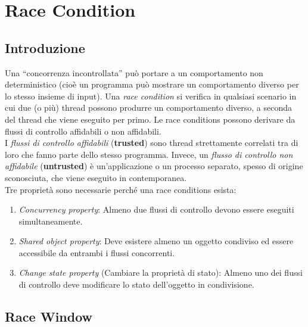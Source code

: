 \chapter{Race Condition}

\section{Introduzione}

Una “concorrenza incontrollata” può portare a un comportamento non deterministico
(cioè un programma può mostrare un comportamento diverso per lo stesso insieme
di input).
Una \textit{race condition} si verifica in qualsiasi scenario in cui due (o più)
thread possono
produrre un comportamento diverso, a seconda del thread che viene eseguito per primo.
Le race conditions possono derivare da flussi di controllo affidabili o non
affidabili.\\
I \textit{flussi di controllo affidabili} (\textbf{trusted}) sono thread
strettamente correlati tra di loro che fanno parte dello stesso programma.
Invece, un \textit{flusso di controllo non affidabile} (\textbf{untrusted})
è un'applicazione o un processo separato, spesso di origine sconosciuta,
che viene eseguito in contemporanea.\\

Tre proprietà sono necessarie perché una race conditions esista:
\begin{enumerate}
    \item \textit{Concurrency property}: Almeno due flussi di controllo
          devono essere eseguiti simultaneamente.
    \item \textit{Shared object property}: Deve esistere almeno un oggetto
          condiviso ed
          essere accessibile da
          entrambi i flussi concorrenti.
    \item \textit{Change state property} (Cambiare la proprietà di stato):
          Almeno uno dei flussi di
          controllo deve modificare lo stato dell'oggetto in condivisione.
\end{enumerate}

\section{Race Window}

